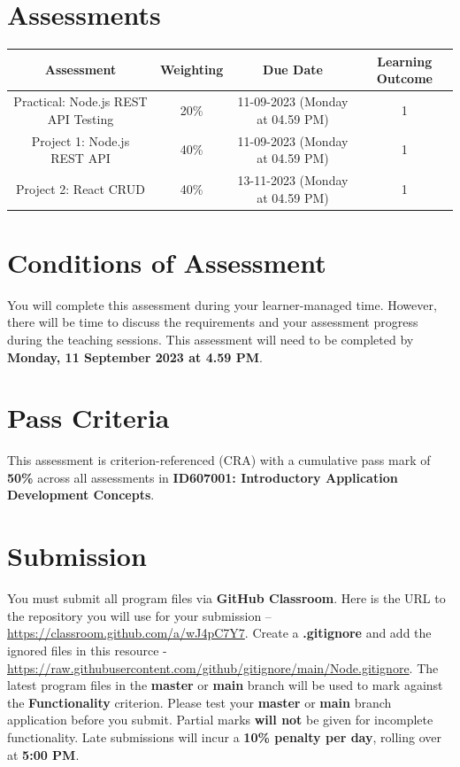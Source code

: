 \documentclass{article}
\begin{document}
\section*{Assessments}
\renewcommand{\arraystretch}{1.5}
\begin{tabular}{|c|c|c|c|}
	\hline
	\textbf{Assessment}                                 & \textbf{Weighting} & \textbf{Due Date}            & \textbf{Learning Outcome} \\ \hline
	\small Practical: Node.js REST API Testing & \small 20\%        & \small 11-09-2023 (Monday at 04.59 PM)   & \small 1                   \\ \hline
	\small Project 1: Node.js REST API                  & \small 40\%        & \small \small 11-09-2023 (Monday at 04.59 PM) & \small 1                   \\ \hline
	\small Project 2: React CRUD                        & \small 40\%        & \small 13-11-2023 (Monday at 04.59 PM)  & \small 1                   \\ \hline
\end{tabular}

\section*{Conditions of Assessment}
You will complete this assessment during your learner-managed time. However, there will be time to discuss the requirements and your assessment progress during the teaching sessions. This assessment will need to be completed by \textbf{Monday, 11 September 2023 at 4.59 PM}.

\section*{Pass Criteria}
This assessment is criterion-referenced (CRA) with a cumulative pass mark of \textbf{50\%} across all assessments in \textbf{ID607001: Introductory Application Development Concepts}.

\section*{Submission}
You must submit all program files via \textbf{GitHub Classroom}. Here is the URL to the repository you will use for your submission – \href{https://classroom.github.com/a/wJ4pC7Y7}{https://classroom.github.com/a/wJ4pC7Y7}. Create a \textbf{.gitignore} and add the ignored files in this resource - \href{https://raw.githubusercontent.com/github/gitignore/main/Node.gitignore}{https://raw.githubusercontent.com/github/gitignore/main/Node.gitignore}. The latest program files in the \textbf{master} or \textbf{main} branch will be used to mark against the \textbf{Functionality} criterion. Please test your \textbf{master} or \textbf{main} branch application before you submit. Partial marks \textbf{will not} be given for incomplete functionality. Late submissions will incur a \textbf{10\% penalty per day}, rolling over at \textbf{5:00 PM}.
\end{document}
